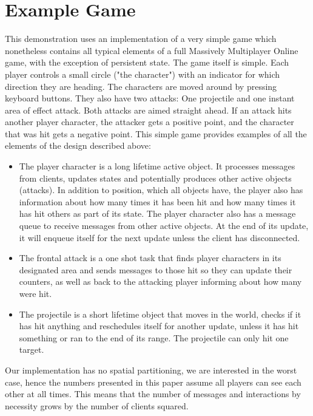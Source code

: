 \section{Example Game}
 This demonstration uses an implementation of a very simple game which
nonetheless contains all typical elements of a full Massively Multiplayer
Online game, with the exception of persistent state. The game itself
is simple. Each player controls a small circle ("the character") with
an indicator for which direction they are heading. The characters are
moved around by pressing keyboard buttons. They also have two attacks:
One projectile and one instant area of effect attack. Both attacks are
aimed straight ahead. If an attack hits another player character, the
attacker gets a positive point, and the character that was hit gets a
negative point. This simple game provides examples of all the elements
of the design described above:\begin{itemize}
\item The player character is a long lifetime active object. It
  processes messages from clients, updates states and potentially
  produces other active objects (attacks). In addition to position,
  which all objects have, the player also has information about how
  many times it has been hit and how many times it has hit others as
  part of its state. The player character also has a message queue to
  receive messages from other active objects. At the end of its
  update, it will enqueue itself for the next update unless
  the client has disconnected.
\item The frontal attack is a one shot task that finds player
  characters in its designated area and sends messages to those hit so
  they can update their counters, as well as back to the attacking
  player informing about how many were hit.
\item The projectile is a short lifetime object that moves in the
  world, checks if it has hit anything and reschedules itself for
  another update, unless it has hit something or ran to the end of its
  range. The projectile can only hit one target.
\end{itemize}

Our implementation has no spatial partitioning, we are interested in the worst
case, hence the numbers presented in this paper assume all players can see each
other at all times. This means that the number of messages and interactions by
necessity grows by the number of clients squared.

